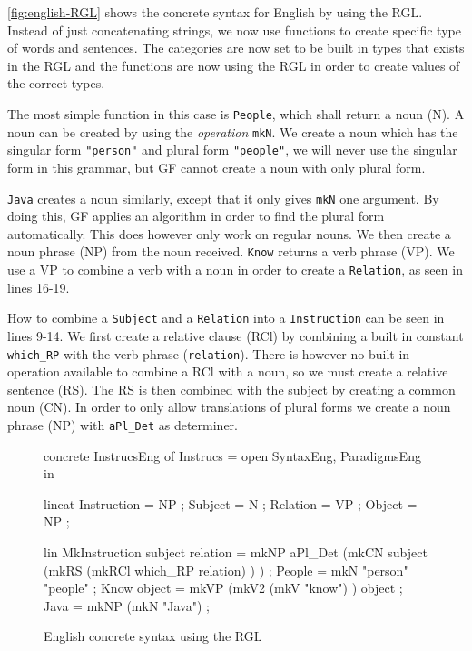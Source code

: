 \autoref{fig:english-RGL} shows the concrete syntax for English by using the RGL. Instead of just concatenating strings, we now use functions to create specific type of words and sentences. The categories are now set to be built in types that exists in the RGL and the functions are now using the RGL in order to create values of the correct types.

The most simple function in this case is \texttt{People}, which shall return a noun (N). A noun can be created by using the \emph{operation} \texttt{mkN}. We create a noun which has the singular form \texttt{"person"} and plural form \texttt{"people"}, we will never use the singular form in this grammar, but GF cannot create a noun with only plural form. 

\texttt{Java} creates a noun similarly, except that it only gives \texttt{mkN} one argument. By doing this, GF applies an algorithm in order to find the plural form automatically. This does however only work on regular nouns. We then create a noun phrase (NP) from the noun received.  \texttt{Know} returns a verb phrase (VP). We use a VP to combine a verb with a noun in order to create a \texttt{Relation}, as seen in lines 16-19. 

How to combine a \texttt{Subject} and a \texttt{Relation} into a \texttt{Instruction} can be seen in lines 9-14. We first create a relative clause (RCl) by combining a built in constant \texttt{which\_RP} with the verb phrase (\texttt{relation}). There is however no built in operation available to combine a RCl with a noun, so we must create a relative sentence (RS). The RS is then combined with the subject by creating a common noun (CN). In order to only allow translations of plural forms we create a noun phrase (NP) with \texttt{aPl\_Det} as determiner.

\begin{figure}[h]
\begin{code}
concrete InstrucsEng of Instrucs = open SyntaxEng, ParadigmsEng in {
  lincat
    Instruction = NP ;
    Subject = N ;
    Relation = VP ;
    Object = NP ;

  lin
    MkInstruction subject relation = mkNP aPl_Det 
                                        (mkCN subject 
                                            (mkRS 
                                                (mkRCl which_RP relation)
                                            )
                                        ) ;
    People = mkN "person" "people" ;
    Know object = mkVP 
                    (mkV2 
                        (mkV "know")
                    ) object ;
    Java = mkNP (mkN "Java") ;
}
\end{code}
\caption{English concrete syntax using the RGL\label{fig:english-RGL}}
\end{figure}

